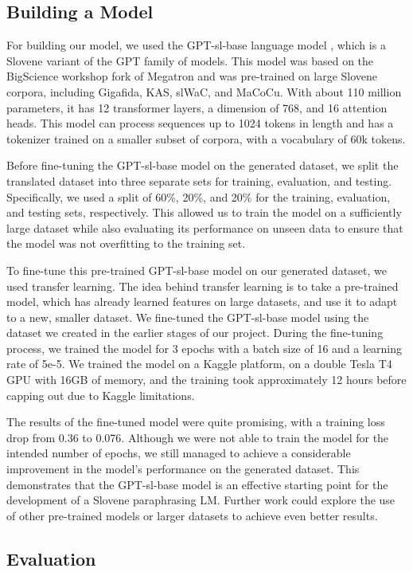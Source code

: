 \documentclass[fleqn,moreauthors,10pt]{ds_report}
\begin{document}
\subsection*{Building a Model}
For building our model, we used the GPT-sl-base language model \cite{huggingface_gptslbase}, which is a Slovene variant of the GPT family of models. This model was based on the BigScience workshop fork of Megatron and was pre-trained on large Slovene corpora, including Gigafida, KAS, slWaC, and MaCoCu. With about 110 million parameters, it has 12 transformer layers, a dimension of 768, and 16 attention heads. This model can process sequences up to 1024 tokens in length and has a tokenizer trained on a smaller subset of corpora, with a vocabulary of 60k tokens.

Before fine-tuning the GPT-sl-base model on the generated dataset, we split the translated dataset into three separate sets for training, evaluation, and testing. Specifically, we used a split of 60\%, 20\%, and 20\% for the training, evaluation, and testing sets, respectively. This allowed us to train the model on a sufficiently large dataset while also evaluating its performance on unseen data to ensure that the model was not overfitting to the training set.

To fine-tune this pre-trained GPT-sl-base model on our generated dataset, we used transfer learning. The idea behind transfer learning is to take a pre-trained model, which has already learned features on large datasets, and use it to adapt to a new, smaller dataset. We fine-tuned the GPT-sl-base model using the dataset we created in the earlier stages of our project. During the fine-tuning process, we trained the model for 3 epochs with a batch size of 16 and a learning rate of 5e-5. We trained the model on a Kaggle platform, on a double Tesla T4 GPU with 16GB of memory, and the training took approximately 12 hours before capping out due to Kaggle limitations.

The results of the fine-tuned model were quite promising, with a training loss drop from 0.36 to 0.076. Although we were not able to train the model for the intended number of epochs, we still managed to achieve a considerable improvement in the model's performance on the generated dataset. This demonstrates that the GPT-sl-base model is an effective starting point for the development of a Slovene paraphrasing LM. Further work could explore the use of other pre-trained models or larger datasets to achieve even better results.


\subsection*{Evaluation}
\end{document}
